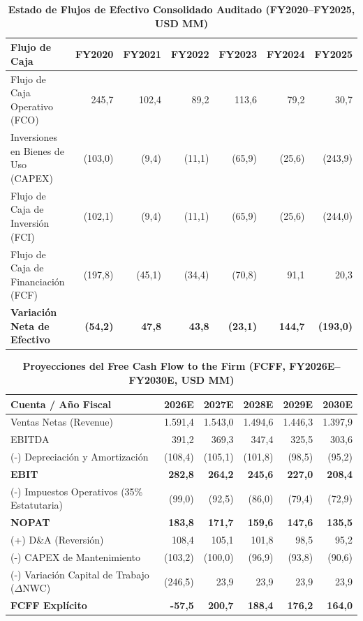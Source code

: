 \documentclass[10pt,a4paper]{article}
\begin{document}
\begin{table}[H]
\centering
\caption{\textbf{Estado de Flujos de Efectivo Consolidado Auditado (FY2020--FY2025, USD MM)}}
\scriptsize
\begin{tabularx}{\textwidth}{Xrrrrrr}
\toprule
\textbf{Flujo de Caja} & \textbf{FY2020} & \textbf{FY2021} & \textbf{FY2022} & \textbf{FY2023} & \textbf{FY2024} & \textbf{FY2025} \\
\midrule
Flujo de Caja Operativo (FCO) & 245,7 & 102,4 & 89,2 & 113,6 & 79,2 & 30,7 \\
Inversiones en Bienes de Uso (CAPEX) & (103,0) & (9,4) & (11,1) & (65,9) & (25,6) & (243,9) \\
Flujo de Caja de Inversión (FCI) & (102,1) & (9,4) & (11,1) & (65,9) & (25,6) & (244,0) \\
Flujo de Caja de Financiación (FCF) & (197,8) & (45,1) & (34,4) & (70,8) & 91,1 & 20,3 \\
\textbf{Variación Neta de Efectivo} & \textbf{(54,2)} & \textbf{47,8} & \textbf{43,8} & \textbf{(23,1)} & \textbf{144,7} & \textbf{(193,0)} \\
\bottomrule
\end{tabularx}
\end{table}

\begin{table}[H]
\centering
\caption{\textbf{Proyecciones del Free Cash Flow to the Firm (FCFF, FY2026E--FY2030E, USD MM)}}
\scriptsize
\begin{tabularx}{\textwidth}{Xrrrrr}
\toprule
\textbf{Cuenta / Año Fiscal} & \textbf{2026E} & \textbf{2027E} & \textbf{2028E} & \textbf{2029E} & \textbf{2030E} \\
\midrule
Ventas Netas (Revenue) & 1.591,4 & 1.543,0 & 1.494,6 & 1.446,3 & 1.397,9 \\
EBITDA & 391,2 & 369,3 & 347,4 & 325,5 & 303,6 \\
(-) Depreciación y Amortización & (108,4) & (105,1) & (101,8) & (98,5) & (95,2) \\
\textbf{EBIT} & \textbf{282,8} & \textbf{264,2} & \textbf{245,6} & \textbf{227,0} & \textbf{208,4} \\
(-) Impuestos Operativos (35\% Estatutaria) & (99,0) & (92,5) & (86,0) & (79,4) & (72,9) \\
\textbf{NOPAT} & \textbf{183,8} & \textbf{171,7} & \textbf{159,6} & \textbf{147,6} & \textbf{135,5} \\
(+) D\&A (Reversión) & 108,4 & 105,1 & 101,8 & 98,5 & 95,2 \\
(-) CAPEX de Mantenimiento & (103,2) & (100,0) & (96,9) & (93,8) & (90,6) \\
(-) Variación Capital de Trabajo ($\Delta$NWC) & (246,5) & 23,9 & 23,9 & 23,9 & 23,9 \\
\midrule
\textbf{FCFF Explícito} & \textbf{-57,5} & \textbf{200,7} & \textbf{188,4} & \textbf{176,2} & \textbf{164,0} \\
\bottomrule
\end{tabularx}
\end{table}
\end{document}
